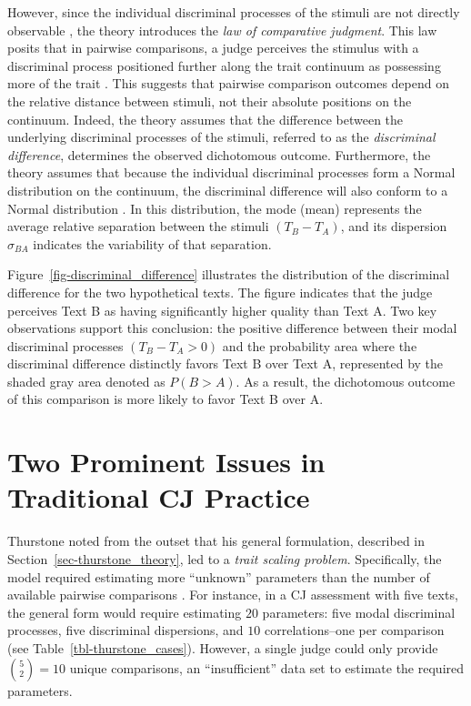 \documentclass[
  authoryear,
  review,
  1p]{elsarticle}
\begin{document}
However, since the individual discriminal processes of the stimuli are
not directly observable \citep{Thurstone_1927a}, the theory introduces
the \emph{law of comparative judgment}. This law posits that in pairwise
comparisons, a judge perceives the stimulus with a discriminal process
positioned further along the trait continuum as possessing more of the
trait \citep{Bramley_2008}. This suggests that pairwise comparison
outcomes depend on the relative distance between stimuli, not their
absolute positions on the continuum. Indeed, the theory assumes that the
difference between the underlying discriminal processes of the stimuli,
referred to as the \emph{discriminal difference}, determines the
observed dichotomous outcome. Furthermore, the theory assumes that
because the individual discriminal processes form a Normal distribution
on the continuum, the discriminal difference will also conform to a
Normal distribution \citep{Andrich_1978}. In this distribution, the mode
(mean) represents the average relative separation between the stimuli
\((T_{B} - T_{A})\), and its dispersion \(\sigma_{BA}\) indicates the
variability of that separation.

Figure~\ref{fig-discriminal_difference} illustrates the distribution of
the discriminal difference for the two hypothetical texts. The figure
indicates that the judge perceives Text B as having significantly higher
quality than Text A. Two key observations support this conclusion: the
positive difference between their modal discriminal processes
\((T_{B} - T_{A} > 0)\) and the probability area where the discriminal
difference distinctly favors Text B over Text A, represented by the
shaded gray area denoted as \(P(B > A)\). As a result, the dichotomous
outcome of this comparison is more likely to favor Text B over A.

\section{Two Prominent Issues in Traditional CJ
Practice}\label{sec-theory-issues}

Thurstone noted from the outset that his general formulation, described
in Section~\ref{sec-thurstone_theory}, led to a \emph{trait scaling
problem}. Specifically, the model required estimating more ``unknown''
parameters than the number of available pairwise comparisons
\citep{Thurstone_1927b}. For instance, in a CJ assessment with five
texts, the general form would require estimating \(20\) parameters: five
modal discriminal processes, five discriminal dispersions, and \(10\)
correlations--one per comparison (see Table~\ref{tbl-thurstone_cases}).
However, a single judge could only provide \({5 \choose 2} = 10\) unique
comparisons, an ``insufficient'' data set to estimate the required
parameters.
\end{document}
